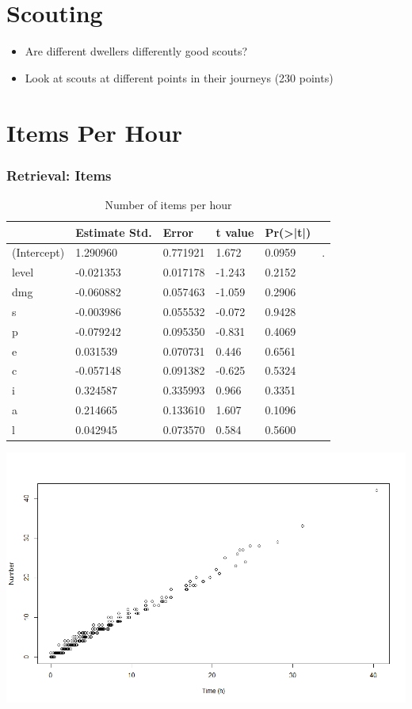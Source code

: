 \documentclass{beamer}
\begin{document}
\section{Scouting}
\begin{frame}
  \begin{itemize}
  \item Are different dwellers differently good scouts?
  \item Look at scouts at different points in their journeys (230 points)
  \end{itemize}

\end{frame}

\section{Items Per Hour}
\begin{frame}
  \frametitle{Retrieval: Items}
  \begin{table}
\caption{Number of items per hour}
\label{table:n.items}
\begin{tabular}{l|lllll}
&Estimate Std.&Error&t value&Pr(>|t|) &\\ 
\hline
(Intercept)&1.290960 &0.771921 &1.672&0.0959&.\\
level&-0.021353  & 0.017178 & -1.243 &  0.2152&  \\
dmg&-0.060882  & 0.057463 & -1.059 &  0.2906&  \\
s&-0.003986  & 0.055532 & -0.072  & 0.9428&  \\
p&-0.079242 &  0.095350 & -0.831 &  0.4069 & \\
e&0.031539 &  0.070731 &  0.446  & 0.6561&  \\
c& -0.057148  & 0.091382 & -0.625 &  0.5324&  \\
i&0.324587&0.335993&   0.966&   0.3351&  \\
a&0.214665&0.133610 &  1.607&   0.1096&  \\
l&0.042945&0.073570&0.584&0.5600&\\
\hline
\end{tabular}
\end{table}
\end{frame}

\begin{frame}
\includegraphics[width=\textwidth]{nitems.png}
\end{frame}
\end{document}
